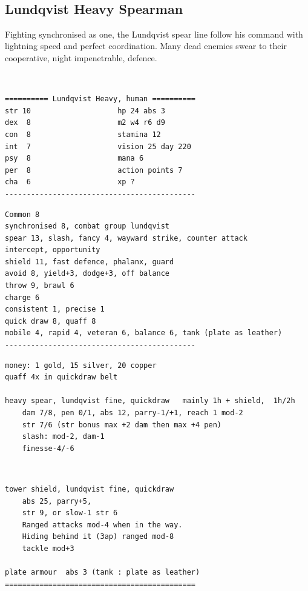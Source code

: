 \


\subsection*{Lundqvist Heavy Spearman}

Fighting synchronised as one, the Lundqvist spear line follow his command with lightning speed and perfect coordination. Many dead enemies swear to their cooperative, night impenetrable, defence.

\

\goodbreak \small \begin{samepage} \begin{verbatim}
========== Lundqvist Heavy, human ==========
str 10                    hp 24 abs 3
dex  8                    m2 w4 r6 d9
con  8                    stamina 12
int  7                    vision 25 day 220
psy  8                    mana 6
per  8                    action points 7
cha  6                    xp ?
--------------------------------------------
\end{verbatim} \end{samepage} \goodbreak \begin{samepage} \begin{verbatim}
Common 8
synchronised 8, combat group lundqvist
spear 13, slash, fancy 4, wayward strike, counter attack
intercept, opportunity
shield 11, fast defence, phalanx, guard
avoid 8, yield+3, dodge+3, off balance
throw 9, brawl 6
charge 6
consistent 1, precise 1
quick draw 8, quaff 8
mobile 4, rapid 4, veteran 6, balance 6, tank (plate as leather)
--------------------------------------------
\end{verbatim} \end{samepage} \goodbreak \begin{samepage} \begin{verbatim}
money: 1 gold, 15 silver, 20 copper
quaff 4x in quickdraw belt

heavy spear, lundqvist fine, quickdraw   mainly 1h + shield,  1h/2h
    dam 7/8, pen 0/1, abs 12, parry-1/+1, reach 1 mod-2
    str 7/6 (str bonus max +2 dam then max +4 pen)
    slash: mod-2, dam-1
    finesse-4/-6
\end{verbatim} \end{samepage}   \   \goodbreak \begin{samepage} \begin{verbatim}
tower shield, lundqvist fine, quickdraw
    abs 25, parry+5,
    str 9, or slow-1 str 6
    Ranged attacks mod-4 when in the way.
    Hiding behind it (3ap) ranged mod-8
    tackle mod+3

plate armour  abs 3 (tank : plate as leather)
============================================
\end{verbatim} \end{samepage} \normalsize

